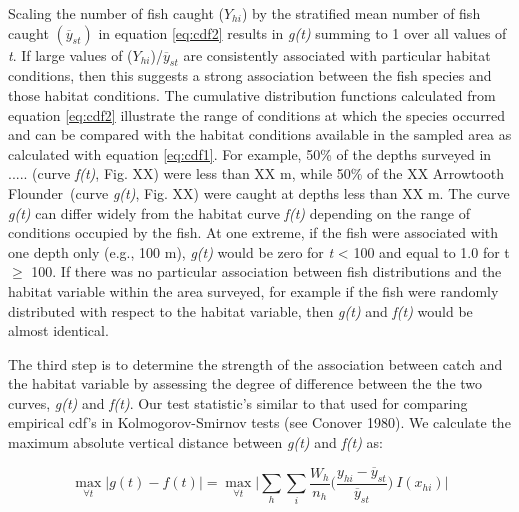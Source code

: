 \documentclass[11pt]{book}\usepackage[]{graphicx}\usepackage[]{color}
\newcommand{\fishnameARF}{Arrowtooth Flounder}
\begin{document}
Scaling the number of fish caught (\emph{$Y_{hi}$}) by the stratified mean number of fish caught $(\overline{y}_{st})$ in equation \ref{eq:cdf2} results in \emph{g(t)} summing to 1 over all values of \emph{t}. If large values of (\emph{$Y_{hi}$})/$\overline{y}_{st}$ are consistently associated with particular habitat conditions, then this suggests a strong association between the fish species and those habitat conditions. The cumulative distribution functions calculated from equation \ref{eq:cdf2} illustrate the range of conditions at which the species occurred and can be compared with the habitat conditions available in the sampled area as calculated with equation \ref{eq:cdf1}. For example, 50\% of the depths surveyed in ..... (curve \emph{f(t)}, Fig. XX) were less than XX m, while 50\% of the XX \fishnameARF\ (curve \emph{g(t)}, Fig. XX) were caught at depths less than XX m. The curve \emph{g(t)} can differ widely from the habitat curve \emph{f(t)} depending on the range of conditions occupied by the fish. At one extreme, if the fish were associated with one depth only (e.g., 100 m), \emph{g(t)} would be zero for \emph{t} < 100 and equal to 1.0 for t $\geq$ 100. If there was no particular association between fish distributions and the habitat variable within the area surveyed, for example if the fish were randomly distributed with respect to the habitat variable, then \emph{g(t)} and \emph{f(t)} would be almost identical.

The third step is to determine the strength of the association between catch and the habitat variable by assessing the degree of difference between the the two curves, \emph{g(t)} and \emph{f(t)}. Our test statistic's similar to that used for comparing empirical cdf's in Kolmogorov-Smirnov tests (see Conover 1980). We calculate the maximum absolute vertical distance between \emph{g(t)} and \emph{f(t)} as:

\begin{equation} \label{eq:cdf3}
\max\limits_{\forall t} \vert g(t) - f(t)\vert = \max\limits_{\forall t} \bigg|  \sum_{h}\sum_{i} \frac{W_h}{n_h} \bigg( \frac{{y_{hi}}-\overline{y}_{st}}{{\overline{y}_{st}}} \bigg) ~I({x_{hi}}) \bigg|
\end{equation}
\end{document}
